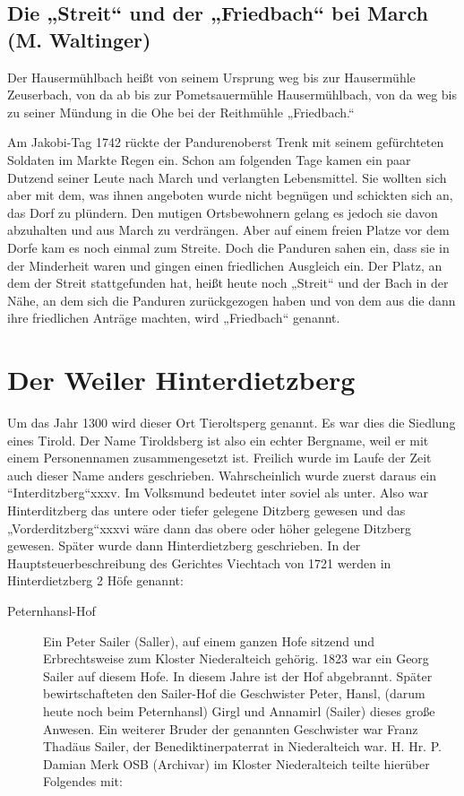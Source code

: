 \documentclass[12pt,a4pager,draft]{book}
\begin{document}
\subsection{Die „Streit“ und der „Friedbach“ bei March (M. Waltinger)}

Der Hausermühlbach heißt von seinem Ursprung weg bis zur Hausermühle Zeuserbach,
von da ab bis zur Pometsauermühle Hausermühlbach, von da weg bis zu seiner
Mündung in die Ohe bei der Reithmühle „Friedbach.“

Am Jakobi-Tag 1742 rückte der Pandurenoberst Trenk mit seinem gefürchteten
Soldaten im Markte Regen ein. Schon am folgenden Tage kamen ein paar Dutzend
seiner Leute nach March und verlangten Lebensmittel. Sie wollten sich aber mit
dem, was ihnen angeboten wurde nicht begnügen und schickten sich an, das Dorf zu
plündern. Den mutigen Ortsbewohnern gelang es jedoch sie davon abzuhalten und
aus March zu verdrängen. Aber auf einem freien Platze vor dem Dorfe kam es noch
einmal zum Streite. Doch die Panduren sahen ein, dass sie in der Minderheit
waren und gingen einen friedlichen Ausgleich ein. Der Platz, an dem der Streit
stattgefunden hat, heißt heute noch „Streit“ und der Bach in der Nähe, an dem
sich die Panduren zurückgezogen haben und von dem aus die dann ihre friedlichen
Anträge machten, wird „Friedbach“ genannt.

\section{Der Weiler Hinterdietzberg}

Um das Jahr 1300 wird dieser Ort Tieroltsperg genannt. Es war dies die Siedlung
eines Tirold. Der Name Tiroldsberg ist also ein echter Bergname, weil er mit
einem Personennamen zusammengesetzt ist. Freilich wurde im Laufe der Zeit auch
dieser Name anders geschrieben. Wahrscheinlich wurde zuerst daraus ein
“Interditzberg“xxxv. Im Volksmund bedeutet inter soviel als unter. Also war
Hinterditzberg das untere oder tiefer gelegene Ditzberg gewesen und das
„Vorderditzberg“xxxvi wäre dann das obere oder höher gelegene Ditzberg gewesen.
Später wurde dann Hinterdietzberg geschrieben. In der Hauptsteuerbeschreibung
des Gerichtes Viechtach von 1721 werden in Hinterdietzberg 2 Höfe genannt:

\begin{description}
\item[Peternhansl-Hof] Ein Peter Sailer (Saller), auf einem ganzen Hofe sitzend
und Erbrechtsweise zum Kloster Niederalteich gehörig. 1823 war ein Georg Sailer
auf diesem Hofe. In diesem Jahre ist der Hof abgebrannt. Später bewirtschafteten
den Sailer-Hof die Geschwister Peter, Hansl, (darum heute noch beim Peternhansl)
Girgl und Annamirl (Sailer) dieses große Anwesen. Ein weiterer Bruder der
genannten Geschwister war Franz Thadäus Sailer, der Benediktinerpaterrat in
Niederalteich war. H. Hr. P. Damian Merk OSB (Archivar) im Kloster Niederalteich
teilte hierüber Folgendes mit:
\end{description}
\end{document}
